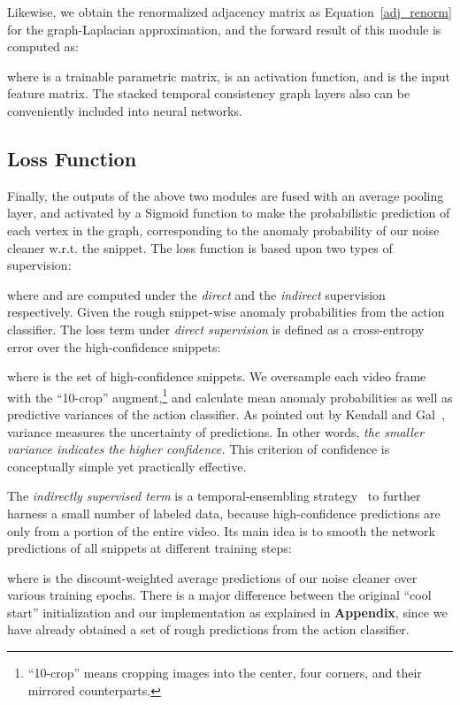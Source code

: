 \documentclass[10pt,twocolumn,letterpaper]{article}
\begin{document}
Likewise, we obtain the renormalized adjacency matrix  as {Equation~\ref{adj_renorm}} for the graph-Laplacian approximation, and the forward result of this module is computed as:

where  is a trainable parametric matrix,  is an activation function, and  is the input feature matrix. The stacked temporal consistency graph layers also can be conveniently included into neural networks.

\subsection{Loss Function} 

Finally, the outputs of the above two modules are fused with an average pooling layer, and activated by a Sigmoid function to make the probabilistic prediction  of each vertex in the graph, corresponding to the anomaly probability of our noise cleaner w.r.t. the  snippet. The loss function  is based upon two types of supervision:

where  and  are computed under the \textit{direct} and the \textit{indirect} supervision respectively. Given the rough snippet-wise anomaly probabilities  from the action classifier. The loss term under \textit{direct supervision} is defined as a cross-entropy error over the high-confidence snippets:

where  is the set of high-confidence snippets. We oversample each video frame with the ``10-crop'' augment,\footnote{``10-crop'' means cropping images into the center, four corners, and their mirrored counterparts.} and calculate mean anomaly probabilities  as well as predictive variances of the action classifier. As pointed out by Kendall and Gal~\cite{NIPS2017_7141}, variance measures the uncertainty of predictions. In other words, \textit{the smaller variance indicates the higher confidence.} This criterion of confidence is conceptually simple yet practically effective.

The \textit{indirectly supervised term} is a temporal-ensembling strategy~\cite{temp_ensemble} to further harness a small number of labeled data, because high-confidence predictions are only from a portion of the entire video. Its main idea is to smooth the network predictions
of all snippets at different training steps:

where  is the discount-weighted average predictions of our noise cleaner over various training epochs. There is a major difference between the original ``cool start'' initialization and our implementation as explained in \textbf{Appendix}, since we have already obtained a set of rough predictions from the action classifier.
\end{document}
